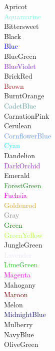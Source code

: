 \documentclass[12pt]{article}
\begin{document}
	\textcolor{Apricot}{Apricot}\\
	\textcolor{Aquamarine}{Aquamarine}\\
	\textcolor{Bittersweet}{Bittersweet}\\
	\textcolor{Black}{Black}\\
	\textcolor{Blue}{Blue}\\
	\textcolor{BlueGreen}{BlueGreen}\\
	\textcolor{BlueViolet}{BlueViolet}\\
	\textcolor{BrickRed}{BrickRed}\\
	\textcolor{Brown}{Brown}\\
	\textcolor{BurntOrange}{BurntOrange}\\
	\textcolor{CadetBlue}{CadetBlue}\\
	\textcolor{CarnationPink}{CarnationPink}\\
	\textcolor{Cerulean}{Cerulean}\\
	\textcolor{CornflowerBlue}{CornflowerBlue}\\
	\textcolor{Cyan}{Cyan}\\
	\textcolor{Dandelion}{Dandelion}\\
	\textcolor{DarkOrchid}{DarkOrchid}\\
	\textcolor{Emerald}{Emerald}\\
	\textcolor{ForestGreen}{ForestGreen}\\
	\textcolor{Fuchsia}{Fuchsia}\\
	\textcolor{Goldenrod}{Goldenrod}\\
	\textcolor{Gray}{Gray}\\
	\textcolor{Green}{Green}\\
	\textcolor{GreenYellow}{GreenYellow}\\
	\textcolor{JungleGreen}{JungleGreen}\\
	\textcolor{Lavender}{Lavender}\\
	\textcolor{LimeGreen}{LimeGreen}\\
	\textcolor{Magenta}{Magenta}\\
	\textcolor{Mahogany}{Mahogany}\\
	\textcolor{Maroon}{Maroon}\\
	\textcolor{Melon}{Melon}\\
	\textcolor{MidnightBlue}{MidnightBlue}\\
	\textcolor{Mulberry}{Mulberry}\\
	\textcolor{NavyBlue}{NavyBlue}\\
	\textcolor{OliveGreen}{OliveGreen}\\
\end{document}
